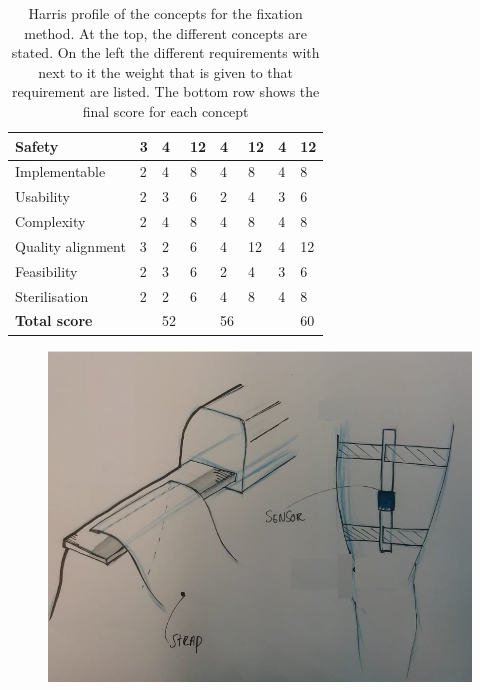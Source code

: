 \documentclass[whitelogo]{tudelft-report}
\begin{document}
{{{\begin{table}[!tbh]
\begin{tabular}{|ll|ll|ll|ll|}
		\multicolumn{1}{|l|}{Safety}                & 3         & \multicolumn{1}{l|}{4}      & 12    & \multicolumn{1}{l|}{4}      & 12    & \multicolumn{1}{l|}{4}      & 12    \\ \hline
		\multicolumn{1}{|l|}{Implementable}         & 2         & \multicolumn{1}{l|}{4}      & 8     & \multicolumn{1}{l|}{4}      & 8     & \multicolumn{1}{l|}{4}      & 8     \\ \hline
		\multicolumn{1}{|l|}{Usability}             & 2         & \multicolumn{1}{l|}{3}      & 6     & \multicolumn{1}{l|}{2}      & 4     & \multicolumn{1}{l|}{3}      & 6     \\ \hline
		\multicolumn{1}{|l|}{Complexity}            & 2         & \multicolumn{1}{l|}{4}      & 8     & \multicolumn{1}{l|}{4}      & 8     & \multicolumn{1}{l|}{4}      & 8     \\ \hline
		\multicolumn{1}{|l|}{Quality alignment}     & 3         & \multicolumn{1}{l|}{2}      & 6     & \multicolumn{1}{l|}{4}     & 12     & \multicolumn{1}{l|}{4}      & 12    \\ \hline
		\multicolumn{1}{|l|}{Feasibility}           & 2         & \multicolumn{1}{l|}{3}      & 6     & \multicolumn{1}{l|}{2}      & 4     & \multicolumn{1}{l|}{3}      & 6     \\ \hline
		\multicolumn{1}{|l|}{Sterilisation}         & 2         & \multicolumn{1}{l|}{2}      & 6     & \multicolumn{1}{l|}{4}      & 8     & \multicolumn{1}{l|}{4}      & 8     \\ \hline
		\textbf{Total score}                        &           &      52                       &       &         56                    &       &                             &     60  \\ \hline
	\end{tabular}
	\caption{Harris profile of the concepts for the fixation method. At the top, the different concepts are stated. On the left the different requirements with next to it the weight that is given to that requirement are listed. The bottom row shows the final score for each concept}
	\label{table:draglift1}
\end{table}
\begin{figure}[!htb]
	\includegraphics[width=1\linewidth]{strap_sketch.jpg}

\end{figure}}}}
\end{document}
